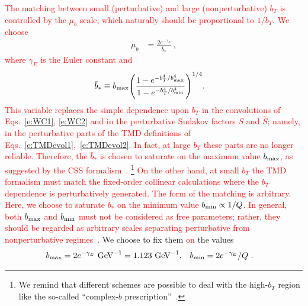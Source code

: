 \documentclass[aps,preprintnumbers,showpacs,nofootinbib,superscriptaddress,floatfix]{revtex4}
\begin{document}
\textcolor{red}{The matching between small (perturbative) and large (nonperturbative) $b_T$ is controlled by the $\mu_b$ scale, which naturally should be proportional to $1/b_T$. We choose }
\begin{align} 
\mu_b &= \frac{2 e^{-\gamma_E}}{\bar{b}_{\ast}} \  ,
\label{e:mub}
\end{align}  
\textcolor{red}{where $\gamma_E$ is the Euler constant and }
\begin{align} 
\bar{b}_{\ast} &\equiv b_{\rm max} \Bigg(\frac{1-e^{- b_T^4 / b_{\rm max}^4} }{1-e^{- b_T^4 / b_{\rm min}^4}} \Bigg)^{1/4} .
\label{e:b*}
\end{align}  
\textcolor{red}{This variable replaces the simple dependence upon $b_T$ in the convolutions of Eqs.~\eqref{e:WC1}, \eqref{e:WC2} and in the perturbative Sudakov factors $S$ and $\hat{S}$; namely, in the perturbative parts of the TMD definitions of Eqs.~\eqref{e:TMDevol1},~\eqref{e:TMDevol2}. In fact, at large $b_T$ these parts are no longer reliable. Therefore, the $\bar{b}_{\ast}$ is chosen to saturate on the maximum value $b_{\rm max}$, as suggested by the CSS formalism~\cite{Collins:2011zzd,Aybat:2011zv}. }\footnote{We remind that different schemes are possible to deal with
the high-$b_T$ region like the so-called ``complex-$b$ prescription''~\cite{Laenen:2000de}.} \textcolor{red}{On the other hand, at small $b_T$ the TMD formalism must match the fixed-order collinear calculations where the $b_T$ dependence is perturbatively generated. The form of the matching is arbitrary. Here, we choose to saturate $\bar{b}_{\ast}$ on the minimum value $b_{\rm min}\propto 1/Q$. In general, both $b_{\rm max}$ and $b_{\rm min}$ must not be considered as free parameters; rather, they should be regarded as arbitrary scales separating perturbative from nonperturbative regimes~\cite{Collins:2014jpa}.} We choose to fix them \textcolor{red}{on} the values
\begin{align}
b_{\rm max} &= 2 e^{-\gamma_E}  \text{  GeV}^{-1} = 1.123 \text{  GeV}^{-1}, 
&
b_{\rm min} &= 2 e^{-\gamma_E}/Q \ .
\label{e:bminmax}
\end{align} 
\end{document}
